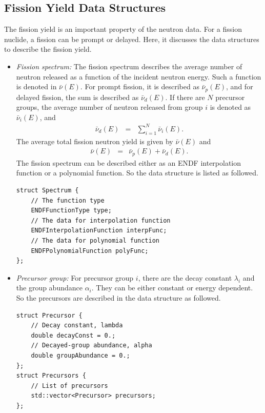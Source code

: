 \subsection{Fission Yield Data Structures}

The fission yield is an important property of the neutron data. For a fission nuclide, a fission can be prompt or delayed. Here, it discusses the data structures to describe the fission yield.

\begin{itemize}

\item{\em Fission spectrum: }
The fission spectrum describes the average number of neutron released as a function of the incident neutron energy. Such a function is denoted in $\bar{\nu}(E)$. For prompt fission, it is described as $\bar{\nu}_p(E)$, and for delayed fission, the sum is described as $\bar{\nu}_d(E)$. If there are $N$ precursor groups, the average number of neutron released from group $i$ is denoted as $\bar{\nu}_i(E)$, and
\begin{eqnarray}
\bar{\nu}_d(E) &=& \sum_{i=1}^{N}\bar{\nu}_i(E).
\end{eqnarray}
The average total fission neutron yield is given by $\bar{\nu}(E)$ and 
\begin{eqnarray}
\bar{\nu}(E) &=& \bar{\nu}_p(E) + \bar{\nu}_d(E).
\end{eqnarray}
The fission spectrum can be described either as an ENDF interpolation function or a polynomial function. So the data structure is listed as followed.
\begin{verbatim}
struct Spectrum {
    // The function type
    ENDFFunctionType type;
    // The data for interpolation function
    ENDFInterpolationFunction interpFunc;
    // The data for polynomial function
    ENDFPolynomialFunction polyFunc;
};
\end{verbatim}

\item{\em Precursor group: }
For precursor group $i$, there are the decay constant $\lambda_i$ and the group abundance $\alpha_i$. They can be either constant or energy dependent. So the precursors are described in the data structure as followed.
\begin{verbatim}
struct Precursor {
    // Decay constant, lambda
    double decayConst = 0.;
    // Decayed-group abundance, alpha
    double groupAbundance = 0.;
};
struct Precursors {
    // List of precursors
    std::vector<Precursor> precursors;
};
\end{verbatim}


\end{itemize}
